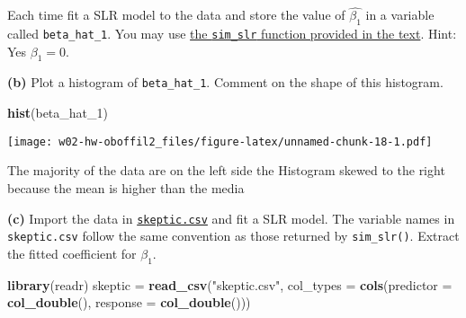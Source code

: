 \documentclass[]{article}
\newenvironment{Shaded}{\begin{snugshade}}{\end{snugshade}}
\newcommand{\DataTypeTok}[1]{\textcolor[rgb]{0.13,0.29,0.53}{#1}}
\newcommand{\DecValTok}[1]{\textcolor[rgb]{0.00,0.00,0.81}{#1}}
\newcommand{\KeywordTok}[1]{\textcolor[rgb]{0.13,0.29,0.53}{\textbf{#1}}}
\newcommand{\NormalTok}[1]{#1}
\newcommand{\OperatorTok}[1]{\textcolor[rgb]{0.81,0.36,0.00}{\textbf{#1}}}
\newcommand{\StringTok}[1]{\textcolor[rgb]{0.31,0.60,0.02}{#1}}
\begin{document}
Each time fit a SLR model to the data and store the value of
\(\hat{\beta_1}\) in a variable called \texttt{beta\_hat\_1}. You may
use
\href{http://daviddalpiaz.github.io/appliedstats/simple-linear-regression.html\#simulating-slr}{the
\texttt{sim\_slr} function provided in the text}. Hint: Yes
\(\beta_1 = 0\).

\textbf{(b)} Plot a histogram of \texttt{beta\_hat\_1}. Comment on the
shape of this histogram.

\begin{Shaded}
\begin{Highlighting}[]
\KeywordTok{hist}\NormalTok{(beta_hat_}\DecValTok{1}\NormalTok{)}
\end{Highlighting}
\end{Shaded}

\texttt{[image: w02-hw-oboffil2\_files/figure-latex/unnamed-chunk-18-1.pdf]}

The majority of the data are on the left side the Histogram skewed to
the right because the mean is higher than the media

\textbf{(c)} Import the data in \href{skeptic.csv}{\texttt{skeptic.csv}}
and fit a SLR model. The variable names in \texttt{skeptic.csv} follow
the same convention as those returned by \texttt{sim\_slr()}. Extract
the fitted coefficient for \(\beta_1\).

\begin{Shaded}
\begin{Highlighting}[]
\KeywordTok{library}\NormalTok{(readr)}
\NormalTok{skeptic =}\StringTok{ }\KeywordTok{read_csv}\NormalTok{(}\StringTok{"skeptic.csv"}\NormalTok{, }
    \DataTypeTok{col_types =} \KeywordTok{cols}\NormalTok{(}\DataTypeTok{predictor =} \KeywordTok{col_double}\NormalTok{(), }
        \DataTypeTok{response =} \KeywordTok{col_double}\NormalTok{()))}
\end{Highlighting}
\end{Shaded}

\begin{Shaded}
\end{Shaded}
\end{document}
